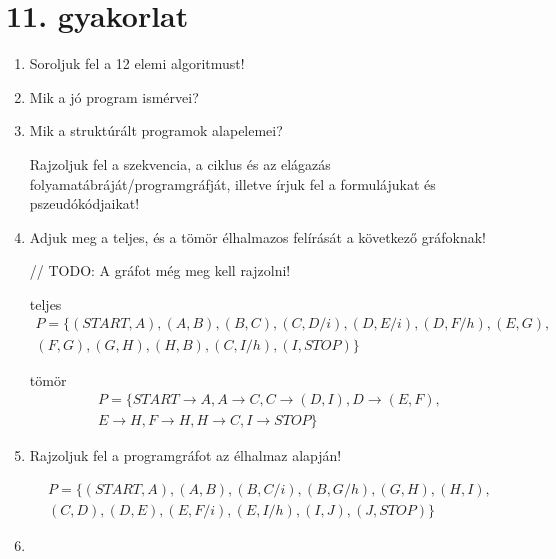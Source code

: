 \documentclass[a4paper]{article}
\begin{document}
\section*{11. gyakorlat}

\begin{enumerate}

\item 

Soroljuk fel a 12 elemi algoritmust!

\item

Mik a jó program ismérvei?

\item

Mik a struktúrált programok alapelemei?

\medskip

Rajzoljuk fel a szekvencia, a ciklus és az elágazás folyamatábráját/programgráfját, illetve írjuk fel a formulájukat és pszeudókódjaikat!

\item

Adjuk meg a teljes, és a tömör élhalmazos felírását a következő gráfoknak!

// TODO: A gráfot még meg kell rajzolni!

teljes
\begin{gather*}
P = \{(START, A), (A, B), (B, C), (C, D/i), (D, E/i), (D, F/h), (E, G), \\
(F, G), (G, H), (H, B), (C, I/h), (I, STOP)\}
\end{gather*}

tömör
\begin{gather*}
P = \{START \rightarrow A, A \rightarrow C, C \rightarrow (D, I), D \rightarrow (E, F), \\
E \rightarrow H, F \rightarrow H, H \rightarrow C, I \rightarrow STOP\}
\end{gather*}

\item

Rajzoljuk fel a programgráfot az élhalmaz alapján!

\begin{gather*}
P = \{
(START, A), (A, B), (B, C/i), (B, G/h), (G, H), (H, I),\\
(C, D), (D, E), (E, F/i), (E, I/h), (I, J), (J, STOP)
\}
\end{gather*}

\item


\end{enumerate}
\end{document}
